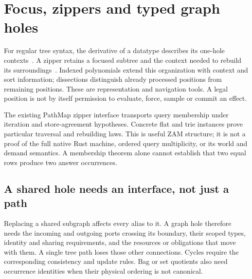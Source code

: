 \documentclass[11pt,a4paper]{article}
\newcommand{\scope}[1]{\par\smallskip\begin{quote}\small\textbf{Boundary.} #1\end{quote}}
\begin{document}
\newpage
\section{Focus, zippers and typed graph holes}
\label{sec:holes}

For regular tree syntax, the derivative of a datatype describes its one-hole
contexts~\cite{Derivative}. A zipper retains a focused subtree and the
context needed to rebuild its surroundings~\cite{Zipper}. Indexed
polynomials extend this organization with context and sort information;
dissections distinguish already processed positions from remaining positions.
These are representation and navigation tools. A legal position is not by
itself permission to evaluate, force, sample or commit an effect.

\begin{center}
\end{center}

The existing PathMap zipper interface transports query membership under
iteration and store-agreement hypotheses. Concrete flat and trie instances
prove particular traversal and rebuilding laws. This is useful ZAM structure;
it is not a proof of the full native Rust machine, ordered query multiplicity,
or its world and demand semantics. A membership theorem alone cannot establish
that two equal rows produce two answer occurrences.

\subsection*{A shared hole needs an interface, not just a path}
Replacing a shared subgraph affects every alias to it. A graph hole therefore
needs the incoming and outgoing ports crossing its boundary, their scoped
types, identity and sharing requirements, and the resources or obligations
that move with them. A single tree path loses those other connections.
Cycles require the corresponding consistency and update rules. Bag or set
quotients also need occurrence identities when their physical ordering is
not canonical.
\end{document}
